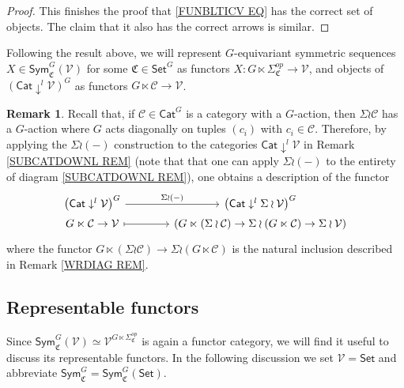 \documentclass[a4paper,10pt
]{article}%
\numberwithin{equation}{section}
\numberwithin{figure}{section}
\theoremstyle{definition} %
\newtheorem{remark}[equation]{Remark}%
\newcommand{\V}{\ensuremath{\mathcal V}}
\newcommand{\1}{\ensuremath{\mathbbm 1}}%
\begin{document}
\begin{proof}
	This finishes the proof that \eqref{FUNBLTICV EQ} has the correct set of objects. The claim that it also has the correct arrows is similar.
\end{proof}


Following the result above, 
we will represent $G$-equivariant symmetric sequences
$X \in \mathsf{Sym}^G_{\mathfrak{C}}(\mathcal{V})$
for some $\mathfrak{C} \in \mathsf{Set}^G$
as functors
$X \colon G \ltimes \Sigma_{\mathfrak{C}}^{op} \to \mathcal{V}$,
and objects of
$\left( \mathsf{Cat} \downarrow^{l} \mathcal{V} \right)^G$
as functors $G \ltimes \mathcal{C} \to \V$.


\begin{remark}\label{RHOPURP REM}
	Recall that, if $\mathcal{C}\in \mathsf{Cat}^G$ is a category with a $G$-action,
	then 
	$\Sigma \wr \mathcal{C}$
	has a $G$-action where $G$ acts diagonally on tuples $(c_i)$ with $c_i \in \mathcal{C}$.
	Therefore, by applying the 
	$\Sigma \wr (-)$
	construction to the categories
	$\mathsf{Cat} \downarrow^l \V$
	in Remark \ref{SUBCATDOWNL REM}
	(note that that one can apply $\Sigma \wr (-)$
	to the entirety of diagram \eqref{SUBCATDOWNL REM}),
	one obtains a description of the functor
	\begin{equation}\label{RHOPURP EQ}
	\begin{tikzcd}[column sep =40,row sep =0]
	\left( \mathsf{Cat} \downarrow^{l} \mathcal{V} \right)^G
	\ar{r}{\Sigma \wr (-) } &
	\left( \mathsf{Cat} \downarrow^{l} \Sigma \wr \mathcal{V} \right)^G
	\\
	G \ltimes \mathcal{C} \to \mathcal{V} \ar[mapsto]{r} &
	\left(G \ltimes (\Sigma \wr \mathcal{C}) \to 
	\Sigma \wr (G \ltimes  \mathcal{C}) \to \Sigma \wr \mathcal{V}\right)
	\end{tikzcd}
	\end{equation}
	where the functor
	$G \ltimes (\Sigma \wr \mathcal{C}) \to 
	\Sigma \wr (G \ltimes  \mathcal{C})$
	is the natural inclusion described in Remark \ref{WRDIAG REM}.
\end{remark}


\subsection{Representable functors}
\label{REPFUN_SEC}

Since  
$\mathsf{Sym}^G_{\mathfrak{C}}(\mathcal{V}) \simeq 
\V^{G \ltimes \Sigma^{op}_{\mathfrak{C}}}$ is again a functor category, 
we will find it useful to discuss its representable functors.
In the following discussion 
we set $\V = \mathsf{Set}$ and abbreviate
$\mathsf{Sym}^G_{\mathfrak{C}} = \mathsf{Sym}^G_{\mathfrak{C}}(\mathsf{Set})$.
\end{document}
